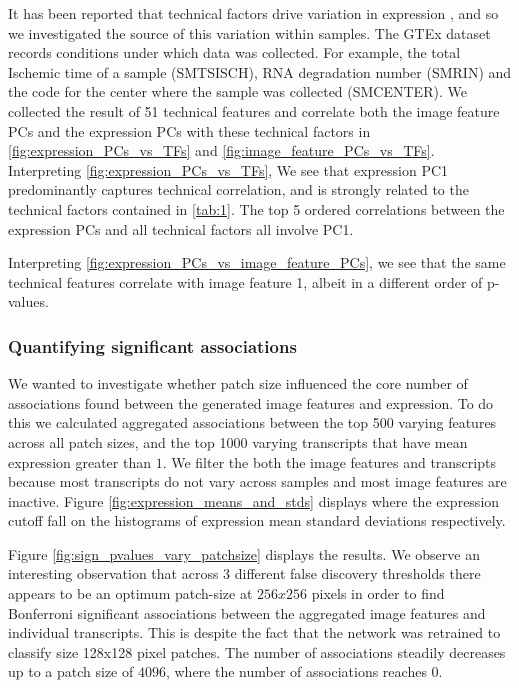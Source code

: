 \documentclass[graybox]{svmult}
\begin{document}
It has been reported that technical factors drive variation in expression \cite{McCall et al. }, and so we investigated the source of this variation within samples. The GTEx dataset records conditions under which data was collected. For example, the total Ischemic time of a sample (SMTSISCH), RNA degradation number (SMRIN) and the code for the center where the sample was collected (SMCENTER). We collected the result of 51 technical features and correlate both the image feature PCs and the expression PCs with these technical factors in \ref{fig:expression_PCs_vs_TFs} and \ref{fig:image_feature_PCs_vs_TFs}. Interpreting \ref{fig:expression_PCs_vs_TFs},  We see that expression PC1 predominantly captures technical correlation, and is strongly related to the technical factors contained in \ref{tab:1}. The top 5 ordered correlations between the expression PCs and all technical factors all involve PC1.

Interpreting \ref{fig:expression_PCs_vs_image_feature_PCs}, we see that the same technical features correlate with image feature 1, albeit in a different order of p-values.

\subsubsection{Quantifying significant associations}

We wanted to investigate whether patch size influenced the core number of associations found between the generated image features and expression. To do this we calculated aggregated associations between the top 500 varying features across all patch sizes, and the top 1000 varying transcripts that have mean expression greater than $1$. We filter the both the image features and transcripts because most transcripts do not vary across samples and most image features are inactive. Figure \ref{fig:expression_means_and_stds} displays where the expression cutoff fall on the histograms of expression mean standard deviations respectively.

Figure \ref{fig:sign_pvalues_vary_patchsize} displays the results. We observe an interesting observation that across $3$ different false discovery thresholds there appears to be an optimum patch-size at $256x256$ pixels in order to find Bonferroni significant associations between the aggregated image features and individual transcripts. This is despite the fact that the network was  retrained to classify size 128x128 pixel patches. The number of associations steadily decreases up to a patch size of $4096$, where the number of associations reaches 0.
\end{document}
